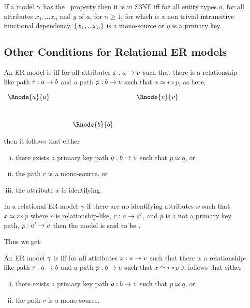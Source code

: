 \begin{lemma}
If a model $\gamma$ has the \fdfactoring\ property then it is in S3NF iff
for all entity types $a$, for all attributes $x_1,...x_n$ and $y$ of $a$, for $n \geq 1$, 
for which  is a non trivial intransitive functional dependency,
$\left\{x_1,...x_n\right\}$ is a mono-source or $y$ is a primary key. 
\end{lemma}
\subsection{Other Conditions for Relational ER models}
\begin{definition} 
An ER model is  iff for all attributes $x:a \rightarrow v$ 
such that there is a relationship-like path $r:a \rightarrow b$ and a path $p:b \rightarrow v$ such that
$x \simeq r \circ p$, as here,
\setlength{\arraycolsep}{.2cm}
\begin{center}
$
\begin{array}{cp{0.5cm}c p{0.5cm} c}
\Rnode{a}{a} &  &              & & \Rnode{v}{\veee}  \\ [1cm]
             &  & \Rnode{b}{b} & &               
\end{array}
$
\end{center}

then it follows that 
either 
\begin{enumerate} [(i)]
\item there exists a primary key path  $q:b \rightarrow v$ such that $p \simeq q$, or
\item the path $r$ is a mono-source, or
\item the attribute $x$ is identifying.
\end{enumerate}
\end{definition}

In a relational ER model $\gamma$ if there are no identifying attributes $x$ such that $x \simeq r \circ p$ where $r$ is relationship-like, $r:a \rightarrow a'$, and $p$ is a not a primary key path, $p:a' \rightarrow v$ then the model is said to be .

Thus we get:
\begin{definition} 
An ER model $\gamma$ is  iff for all attributes $x:a \rightarrow v$
such that there is a relationship-like path $r:a \rightarrow b$ and a path $p:b \rightarrow v$ such that
$x \simeq r \circ p$ it follows that 
either 
\begin{enumerate} [(i)]
\item there exists a primary key path  $q:b \rightarrow v$ such that $p \simeq q$, or
\item the path $r$ is a mono-source.
\end{enumerate}
\end{definition}

